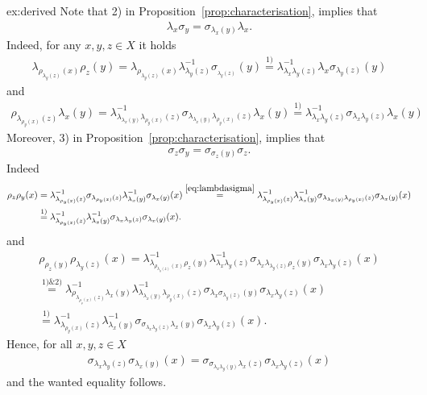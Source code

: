 \begin{sol}{ex:derived}
    Note that 2) in Proposition~\ref{prop:characterisation}, implies that 
    \begin{align}\label{eq:lambdasigma}
        \lambda_x\sigma_y = \sigma_{\lambda_x(y)}\lambda_x.
    \end{align}
    Indeed, for any $x,y,z\in X$ it holds
    \begin{align*}
        \lambda_{\rho_{\lambda_y(z)}(x)}\rho_z(y)= \lambda_{\rho_{\lambda_y(z)}(x)}\lambda^{-1}_{\lambda_y(z)}\sigma_{_{\lambda_y(z)}}(y)
        \overset{1)}{=}\lambda^{-1}_{\lambda_x\lambda_y(z)}\lambda_x\sigma_{\lambda_y(z)}(y)
    \end{align*}
    and
    \begin{align*}
        \rho_{\lambda_{\rho_y(x)}(z)}\lambda_x(y) = \lambda^{-1}_{\lambda_{\lambda_x(y)}\lambda_{\rho_y(x)}(z)}\sigma_{\lambda_{\lambda_x(y)}\lambda_{\rho_y(x)}(z)}\lambda_x(y)\overset{1)}{=}\lambda^{-1}_{\lambda_x\lambda_y(z)}\sigma_{\lambda_x\lambda_y(z)}\lambda_x(y)
    \end{align*}
    Moreover, 3) in  Proposition~\ref{prop:characterisation}, implies that 
    \begin{align*}
        \sigma_z\sigma_y=\sigma_{\sigma_z(y)}\sigma_z.
    \end{align*}
    Indeed
    \begin{align*}
        \rho_z\rho_y(x) &=\lambda^{-1}_{\lambda_{\rho_y(x)}(z)}\sigma_{\lambda_{\rho_y(x)}(z)}\lambda^{-1}_{\lambda_x(y)}\sigma_{\lambda_x(y)}(x)
        \overset{\eqref{eq:lambdasigma}}{=}\lambda^{-1}_{\lambda_{\rho_y(x)}(z)}\lambda^{-1}_{\lambda_x(y)}\sigma_{\lambda_{\lambda_x(y)}\lambda_{\rho_y(x)}(z)}\sigma_{\lambda_x(y)}(x)\\
        &\overset{1)}{=}\lambda^{-1}_{\lambda_{\rho_y(x)}(z)}\lambda^{-1}_{\lambda_x(y)}\sigma_{\lambda_x\lambda_y(z)}\sigma_{\lambda_x(y)}(x).
    \end{align*}
    and
    \begin{align*}
        \rho_{\rho_z(y)}\rho_{\lambda_y(z)}(x) = 
        \lambda^{-1}_{\lambda_{\rho_{\lambda_y(z)}(x)}\rho_z(y)}\lambda^{-1}_{\lambda_x\lambda_y(z)}\sigma_{\lambda_x\lambda_{\lambda_y(z)}\rho_z(y)}\sigma_{\lambda_x\lambda_y(z)}(x)\\
        \overset{1)\&2)}{=}\lambda^{-1}_{\rho_{\lambda_{\rho_y(x)}(z)}\lambda_x(y)}\lambda^{-1}_{\lambda_{\lambda_x(y)}\lambda_{\rho_y(x)}(z)}\sigma_{\lambda_x\sigma_{\lambda_y(z)}(y)}\sigma_{\lambda_x\lambda_y(z)}(x)\\
        \overset{1)}{=}\lambda^{-1}_{\lambda_{\rho_y(x)}(z)}\lambda^{-1}_{\lambda_x(y)}\sigma_{\sigma_{\lambda_x\lambda_y(z)}\lambda_x(y)}\sigma_{\lambda_x\lambda_y(z)}(x).
    \end{align*}
    Hence, for all $x,y,z\in X$
    \begin{align*}
        \sigma_{\lambda_x\lambda_y(z)}\sigma_{\lambda_x(y)}(x)=\sigma_{\sigma_{\lambda_x\lambda_y(y)}\lambda_x(z)}\sigma_{\lambda_x\lambda_y(z)}(x)
    \end{align*}
    and the wanted equality follows.


\end{sol}
